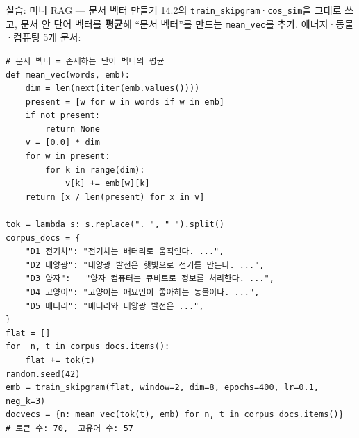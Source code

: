 \begin{frame}[fragile]{실습: 미니 RAG --- 문서 벡터 만들기}
  14.2의 \texttt{train\_skipgram}·\texttt{cos\_sim}을 그대로 쓰고,
  문서 안 단어 벡터를 \textbf{평균}해 ``문서 벡터''를 만드는
  \texttt{mean\_vec}를 추가. \; 에너지·동물·컴퓨팅 5개 문서:
\begin{lstlisting}
# 문서 벡터 = 존재하는 단어 벡터의 평균
def mean_vec(words, emb):
    dim = len(next(iter(emb.values())))
    present = [w for w in words if w in emb]
    if not present:
        return None
    v = [0.0] * dim
    for w in present:
        for k in range(dim):
            v[k] += emb[w][k]
    return [x / len(present) for x in v]

tok = lambda s: s.replace(". ", " ").split()
corpus_docs = {
    "D1 전기차": "전기차는 배터리로 움직인다. ...",
    "D2 태양광": "태양광 발전은 햇빛으로 전기를 만든다. ...",
    "D3 양자":   "양자 컴퓨터는 큐비트로 정보를 처리한다. ...",
    "D4 고양이": "고양이는 애묘인이 좋아하는 동물이다. ...",
    "D5 배터리": "배터리와 태양광 발전은 ...",
}
flat = []
for _n, t in corpus_docs.items():
    flat += tok(t)
random.seed(42)
emb = train_skipgram(flat, window=2, dim=8, epochs=400, lr=0.1, neg_k=3)
docvecs = {n: mean_vec(tok(t), emb) for n, t in corpus_docs.items()}
# 토큰 수: 70,  고유어 수: 57
\end{lstlisting}
\end{frame}
